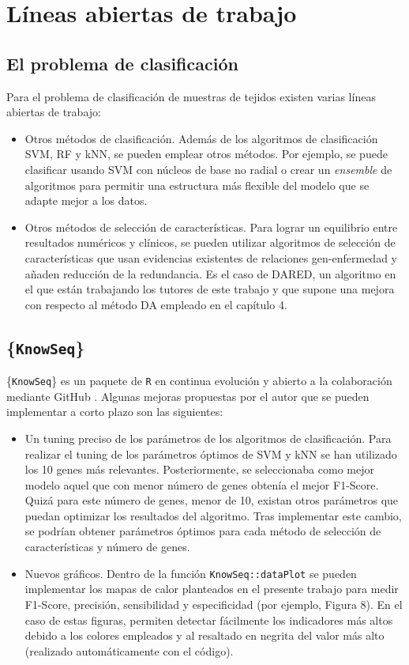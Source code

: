 \chapter{Líneas abiertas de trabajo}

\section{El problema de clasificación}

Para el problema de clasificación de muestras de tejidos existen varias líneas abiertas de trabajo:

\begin{itemize}
	\item Otros métodos de clasificación. Además de los algoritmos de clasificación SVM, RF y kNN, se pueden emplear otros métodos. Por ejemplo, se puede clasificar usando SVM con núcleos de base no radial o crear un \textit{ensemble} de algoritmos para permitir una estructura más flexible del modelo que se adapte mejor a los datos.
	\item Otros métodos de selección de características. Para lograr un equilibrio entre resultados numéricos y clínicos, se pueden utilizar algoritmos de selección de características que usan evidencias existentes de relaciones gen-enfermedad y añaden reducción de la redundancia. Es el caso de DARED, un algoritmo en el que están trabajando los tutores de este trabajo y que supone una mejora con respecto al método DA empleado en el capítulo 4.
\end{itemize}

\section{\{\texttt{KnowSeq}\}}

\{\texttt{KnowSeq}\} es un paquete de \texttt{R} en continua evolución y abierto a la colaboración mediante GitHub \cite{KnowSeq}. Algunas mejoras propuestas por el autor que se pueden implementar a corto plazo son las siguientes:

\begin{itemize}
	\item Un tuning preciso de los parámetros de los algoritmos de clasificación. Para realizar el tuning de los parámetros óptimos de SVM y kNN se han utilizado los 10 genes más relevantes. Posteriormente, se seleccionaba como mejor modelo aquel que con menor número de genes obtenía el mejor F1-Score. Quizá para este número de genes, menor de 10, existan otros parámetros que puedan optimizar los resultados del algoritmo. Tras implementar este cambio, se podrían obtener parámetros óptimos para cada método de selección de características y número de genes.
		\item Nuevos gráficos. Dentro de la función \texttt{KnowSeq::dataPlot} se pueden implementar los mapas de calor planteados en el presente trabajo para medir F1-Score, precisión, sensibilidad y especificidad (por ejemplo, Figura 8). En el caso de estas figuras, permiten detectar fácilmente los indicadores más altos debido a los colores empleados y al resaltado en negrita del valor más alto (realizado automáticamente con el código).
\end{itemize}

